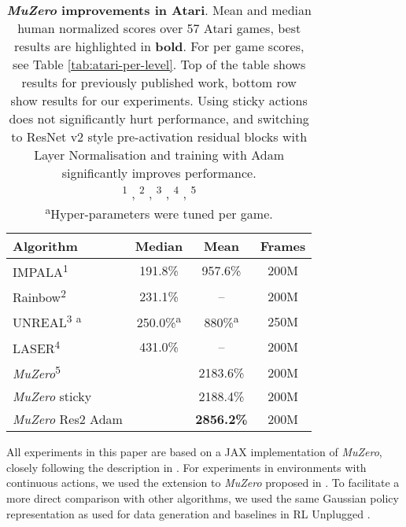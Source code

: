 \documentclass{article}
\newcommand{\muzero}{\emph{MuZero}}
\begin{document}
\begin{table}[t]
\begin{tabularx}{\columnwidth}{l c c c}
\toprule
Algorithm &   Median &     Mean & Frames \\
\midrule
IMPALA\textsuperscript{1}  & 191.8\% & 957.6\% & 200M \\
Rainbow\textsuperscript{2} &  231.1\% & -- & 200M \\
UNREAL\textsuperscript{3} \textsuperscript{a}  & 250.0\%\textsuperscript{a} & 880\%\textsuperscript{a} & 250M \\
LASER\textsuperscript{4} & 431.0\% & -- & 200M \\
\muzero{}\textsuperscript{5} &  & 2183.6\%
  & 200M \\
\midrule
\muzero{} sticky &  & 2188.4\%
  & 200M \\
\muzero{} Res2 Adam & \textbf{} & \textbf{2856.2\%
 } & 200M \\
\bottomrule
\end{tabularx}

\caption{
\label{tab:atari-comparison}
\textbf{\muzero{} improvements in Atari}. Mean and median human normalized scores over 57 Atari games, best results are highlighted in \textbf{bold}. For per game scores, see Table \ref{tab:atari-per-level}. Top of the table shows results for previously published work, bottom row show results for our experiments. Using sticky actions does not significantly hurt performance, and switching to ResNet v2 style pre-activation residual blocks with Layer Normalisation and training with Adam significantly improves performance.\\
\textsuperscript{1} \cite{impala},  \textsuperscript{2} \cite{rainbow}, \textsuperscript{3} \cite{unreal}, \textsuperscript{4} \cite{laser}, \textsuperscript{5} \cite{muzero}\\
\textsuperscript{a}Hyper-parameters were tuned per game.
}
\end{table}

All experiments in this paper are based on a JAX \cite{jax2018github} implementation of  \muzero{}, closely following the description in \cite{muzero}. For experiments in environments with continuous actions, we used the extension to  \muzero{} proposed in \cite{muzero_sampled}. To facilitate a more direct comparison with other algorithms, we used the same Gaussian policy representation as used for data generation and baselines in RL Unplugged \cite{rl_unplugged}.
\end{document}
